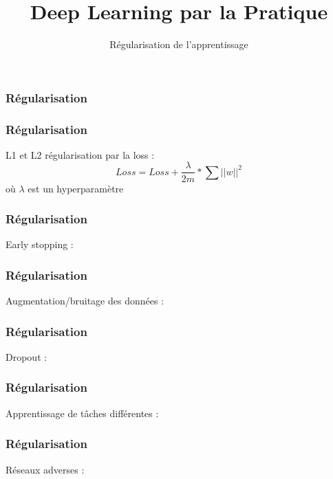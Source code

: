 \documentclass{formation}
\title{Deep Learning par la Pratique}
\subtitle{Régularisation de l'apprentissage}
\begin{document}
\maketitle

\begin{frame}
  \frametitle{Régularisation}
\end{frame}

\begin{frame}
  \frametitle{Régularisation}
  L1 et L2 régularisation par la loss : \\
  \[
  Loss = Loss + \frac{\lambda}{2m}*\sum||w||^2
  \]
  où $\lambda$ est un hyperparamètre
\end{frame}

\begin{frame}
  \frametitle{Régularisation}
  Early stopping :
\end{frame}

\begin{frame}
  \frametitle{Régularisation}
  Augmentation/bruitage des données :
\end{frame}

\begin{frame}
  \frametitle{Régularisation}
  Dropout :
\end{frame}

\begin{frame}
  \frametitle{Régularisation}
  Apprentissage de tâches différentes :
\end{frame}

\begin{frame}
  \frametitle{Régularisation}
  Réseaux adverses :
\end{frame}
\end{document}
